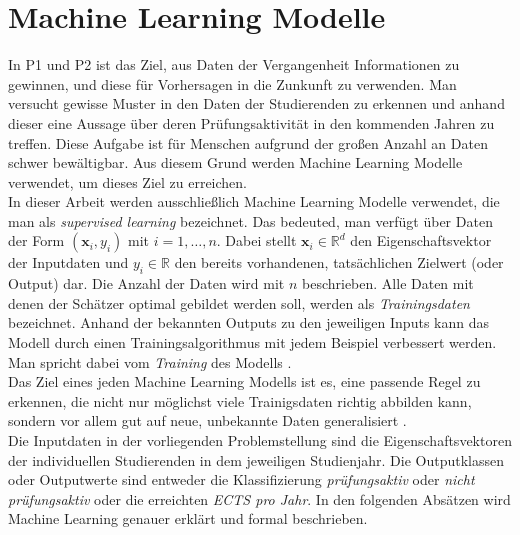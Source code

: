 
\section{Machine Learning Modelle}
\label{sec:ml}

In P1 und P2 ist das Ziel, aus Daten der Vergangenheit Informationen zu gewinnen, und diese f\"ur Vorhersagen in die Zunkunft zu verwenden.
Man versucht gewisse Muster in den Daten der Studierenden zu erkennen und anhand dieser eine Aussage \"uber deren Pr\"ufungsaktivit\"at in den kommenden Jahren zu treffen.
Diese Aufgabe ist f\"ur Menschen aufgrund der gro{\ss}en Anzahl an Daten schwer bew\"altigbar. Aus diesem Grund werden Machine Learning Modelle verwendet,
um dieses Ziel zu erreichen. \\

In dieser Arbeit werden ausschlie{\ss}lich Machine Learning Modelle verwendet, die man als \textit{supervised learning} bezeichnet. 
Das bedeuted, man verf\"ugt \"uber Daten der Form $(\mathbf{x}_i, y_i)$ mit $i = 1,\dots,n$. Dabei stellt $\mathbf{x}_i \in \mathbb{R}^d$ den Eigenschaftsvektor 
der Inputdaten und $y_i \in \mathbb{R}$ den bereits vorhandenen, tats\"achlichen Zielwert (oder Output) dar. Die Anzahl der Daten wird mit $n$ beschrieben. Alle Daten mit denen der 
Sch\"atzer optimal gebildet werden soll, werden als \textit{Trainingsdaten} bezeichnet. 
Anhand der bekannten Outputs zu den jeweiligen Inputs kann das Modell durch einen Trainingsalgorithmus mit jedem Beispiel verbessert werden.
Man spricht dabei vom \textit{Training} des Modells \cite[Seiten 19 bis 25]{shalev}. \\

Das Ziel eines jeden Machine Learning Modells ist es, eine passende Regel zu erkennen, die nicht nur m\"oglichst viele Trainigsdaten richtig abbilden kann, sondern vor allem 
gut auf neue, unbekannte Daten generalisiert \cite[Seite 371]{strang}. \\

Die Inputdaten in der vorliegenden Problemstellung sind die Eigenschaftsvektoren der individuellen Studierenden in dem jeweiligen Studienjahr. Die Outputklassen oder 
Outputwerte sind entweder die Klassifizierung \textit{pr\"ufungsaktiv} oder \textit{nicht pr\"ufungsaktiv} oder die erreichten \textit{ECTS pro Jahr}. 
In den folgenden Abs\"atzen wird Machine Learning genauer erkl\"art und formal beschrieben. \\



